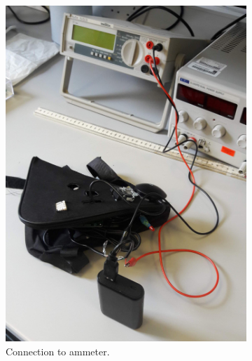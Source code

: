 \documentclass[11pt]{report}
\begin{document}


\begin{figure}
\centering
\begin{subfigure}[b]{0.4\textwidth}
  \includegraphics[width=\textwidth]{images/ammeter}
  \caption{Connection to ammeter.}
  \label{fig: ammeter}
\end{subfigure}
\hfill
\begin{subfigure}[b]{0.4\textwidth}

\end{subfigure}
\end{figure}
\end{document}
